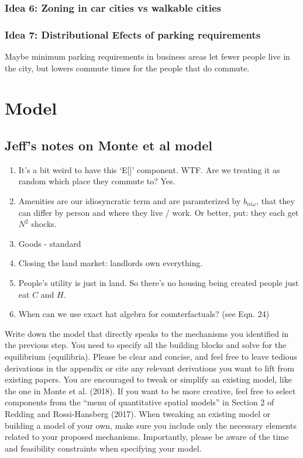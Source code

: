 \documentclass{article}
\begin{document}
\subsubsection{Idea 6: Zoning in car cities vs walkable cities}

\subsubsection{Idea 7: Distributional Efects of parking requirements}
Maybe minimum parking requirements in business areas let fewer people live in the city, but lowers commute times for the people that do commute.
\section{Model}

\subsection{Jeff's notes on Monte et al model}
\begin{enumerate}
\item It's a bit weird to have this `E[]' component. WTF. Are we treating it as random which place they commute to? Yes.
\item Amenities are our idiosyncratic term and are paramterized by $b_{ni\omega}$, that they can differ by person and where they live / work. Or better, put: they each get $N^2$ shocks.
\item Goods - standard
\item Closing the land market: landlords own everything.
\item People's utility is just in land. So there's no housing being created people just eat $C$ and $H$.
\item  When can we use exact hat algebra for counterfactuals? (see Eqn. 24)
\end{enumerate}

Write down the model that directly speaks to the mechanisms you identified
in the previous step. You need to specify all the building blocks and solve for the
equilibrium (equilibria). Please be clear and concise, and feel free to leave tedious
derivations in the appendix or cite any relevant derivations you want to lift from
existing papers.
You are encouraged to tweak or simplify an existing model, like the one in Monte et
al. (2018). If you want to be more creative, feel free to select components from the
“menu of quantitative spatial models” in Section 2 of Redding and Rossi-Hansberg
(2017). When tweaking an existing model or building a model of your own, make
sure you include only the necessary elements related to your proposed mechanisms.
Importantly, please be aware of the time and feasibility constraints when specifying
your model.
\end{document}
